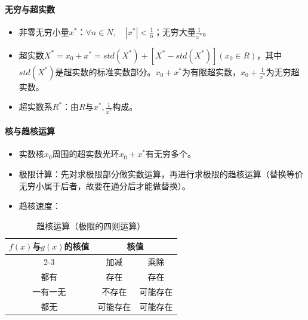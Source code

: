 \documentclass[
12pt, %
a4paper, 
oneside, %
]{scrartcl}
\begin{document}
\paragraph{无穷与超实数}
\begin{itemize}
\item 非零无穷小量$ x^* $：$ \forall n \in N, \quad |x^*| < \frac{1}{n} $；无穷大量$ \frac{1}{x^*} $。
\item 超实数$ X^* = x_0 + x^* = std(X^*) + [X^* - std(X^*)](x_0 \in R) $，其中$ std(X^*) $是超实数的标准实数部分。$ x_0 + x^* $为有限超实数，$ x_0 + \frac{1}{x^*} $为无穷超实数。
\item 超实数系$ R^* $：由$ R $与$ x^*, \frac{1}{x^*} $构成。
\end{itemize}
\paragraph{核与趋核运算}
\begin{itemize}
\item 实数核$ x_0 $周围的超实数光环$ x_0 + x^* $有无穷多个。
\item 极限计算：先对求极限部分做实数运算，再进行求极限的趋核运算（替换等价无穷小属于后者，故要在通分后才能做替换）。
\item 趋核速度：
\end{itemize}

\begin{table}[H]
\centering
\begin{tabular}{c|cc}
\hline
$ f(x) $与$ g(x) $的核值 & \multicolumn{2}{c}{核值} \\
\cline{2-3}
& 加减 & 乘除 \\
\hline
都有 & 存在 & 存在 \\
一有一无 & 不存在 & 可能存在 \\
都无 & 可能存在 & 可能存在 \\
\hline
\end{tabular}
\caption{趋核运算（极限的四则运算）}
\end{table}
\end{document}
